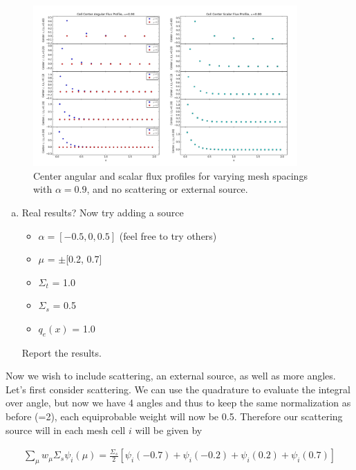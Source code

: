 \documentclass[10pt]{article}
\begin{document}
\begin{figure}[H]
    \centering
    \includegraphics[width=0.9\textwidth]{Figures/FluxProfile_a=09}
    \caption{Center angular and scalar flux profiles for varying mesh spacings with $\alpha = 0.9$, and no scattering or external source.}
    \label{fig7}
\end{figure}

%
%
%

\begin{enumerate}[(c)]
\item Real results? Now try adding a source
\begin{itemize}
\setlength\itemsep{0em}
\item $\alpha = [-0.5, 0, 0.5]$ (feel free to try others)
\item $\mu$ = $\pm$[0.2, 0.7] %
\item $\Sigma_t$ = 1.0
\item $\Sigma_s$ = 0.5
\item $q_e(x)$ = 1.0
\end{itemize}
Report the results.
\end{enumerate}

Now we wish to include scattering, an external source, as well as more angles. Let's first consider scattering. We can use the quadrature to evaluate the integral over angle, but now we have 4 angles and thus to keep the same normalization as before (=2), each equiprobable weight will now be 0.5. Therefore our scattering source will in each mesh cell $i$ will be given by

\begin{align*}
    \sum_\mu w_\mu \Sigma_s \psi_i(\mu) = \frac{\Sigma_s}{2}\left[\psi_i(-0.7) + \psi_i(-0.2) + \psi_i(0.2) + \psi_i(0.7)\right]
\end{align*}
\end{document}
